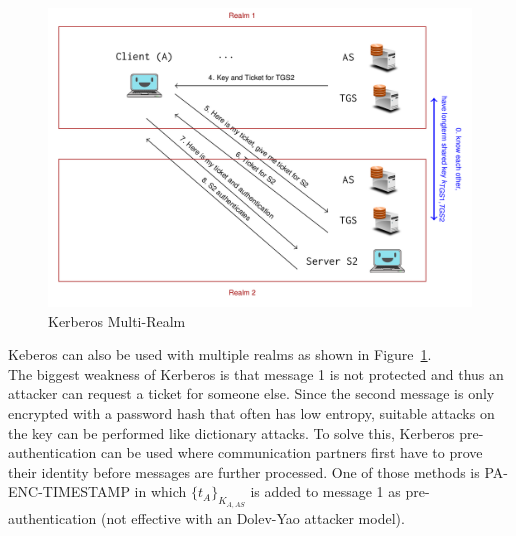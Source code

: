 \begin{figure}[H]
  \centering
  \includegraphics[width=.8\textwidth]{figures/kerberos_multi_realm.png}
  \caption{Kerberos Multi-Realm}\label{fig:kerberos_multi_realm}
\end{figure}
Keberos can also be used with multiple realms as shown in Figure~\ref{fig:kerberos_multi_realm}.\\

The biggest weakness of Kerberos is that message 1 is not protected and thus an attacker can request a ticket for someone else.
Since the second message is only encrypted with a password hash that often has low entropy, suitable attacks on the key can be performed like dictionary attacks.
To solve this, Kerberos pre-authentication can be used where communication partners first have to prove their identity before messages are further processed.
One of those methods is PA-ENC-TIMESTAMP in which $\{t_A\}_{K_{A,AS}}$ is added to message 1 as pre-authentication (not effective with an Dolev-Yao attacker model).
